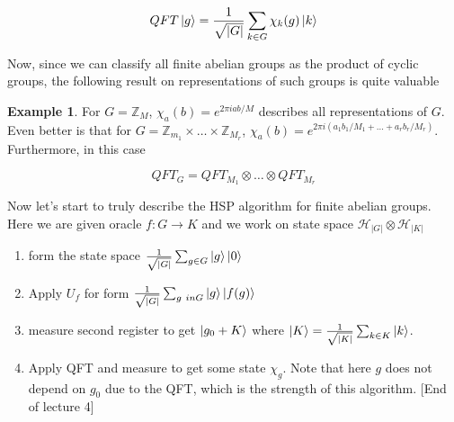 \documentclass{article}
\theoremstyle{definition}
\newtheorem{example}{Example}
\begin{document}
$$ QFT \ket{g} = \frac{1}{\sqrt{|G|}} \sum_{k \in G} \chi_k(g) \ket{k} $$

Now, since we can classify all finite abelian groups as the product of cyclic
groups, the following result on representations of such groups is quite valuable

\begin{example}
For $G = \mathbb{Z}_M$, $\chi_a(b) = e^{2 \pi i ab / M}$ describes all
representations of $G$. Even better is that for $G = \mathbb{Z}_{m_1} \times
\dots \times \mathbb{Z}_{M_r}$, $\chi_{a}(b) = e^{2\pi i (a_1b_1 / M_1 + \dots +
  a_r b_r / M_r)}$. Furthermore, in this case

$$ QFT_G = QFT_{M_1} \otimes \dots \otimes QFT_{M_r} $$
\end{example}

Now let's start to truly describe the HSP algorithm for finite abelian groups.
Here we are given oracle $f:G \to K$ and we work on state space
$\mathcal{H}_{|G|} \otimes \mathcal{H}_{|K|}$

\begin{enumerate}
\item form the state space $ \frac{1}{\sqrt{|G|}} \sum_{g \in G} \ket{g}\ket{0}$
\item Apply $U_f$ for form $\frac{1}{\sqrt{|G|}} \sum_{g \ in G} \ket{g} \ket{f(g)}$
\item measure second register to get $\ket{g_0 + K}$ where $\ket{K} =
  \frac{1}{\sqrt{|K|}} \sum_{k \in K} \ket{k}$. 
\item Apply QFT and measure to get some state $\chi_g$. Note that here $g$
  does not depend on $g_0$ due to the QFT, which is the strength of this
  algorithm. [End of lecture 4]
\end{enumerate}
\end{document}
